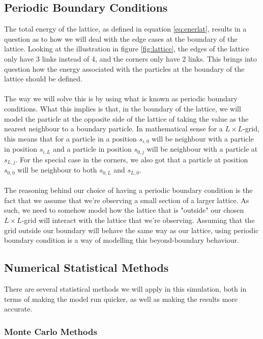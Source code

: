 \documentclass[reprint,english,notitlepage]{revtex4-1}  %
\begin{document}
\subsection{Periodic Boundary Conditions}

The total energy of the lattice, as defined in equation \ref{eq:enerlat}, results in a question as to how we will deal with the edge cases at the boundary of the lattice. Looking at the illustration in figure \ref{fig:lattice}, the edges of the lattice only have 3 links instead of 4, and the corners only have 2 links. This brings into question how the energy associated with the particles at the boundary of the lattice should be defined.
\\
\\
The way we will solve this is by using what is known as periodic boundary conditions. What this implies is that, in the boundary of the lattice, we will model the particle at the opposite side of the lattice of taking the value as the nearest neighbour to a boundary particle. In mathematical sense for a $L\times L$-grid, this means that for a particle in a position $s_{i,0}$ will be neighbour with a particle in position $s_{i,L}$ and a particle in position $s_{0,j}$ will be neighbour with a particle at $s_{L,j}$. For the special case in the corners, we also got that a particle at position $s_{0,0}$ will be neighbour to both $s_{0,L}$ and $s_{L,0}$. 
\\
\\
The reasoning behind our choice of having a periodic boundary condition is the fact that we assume that we're observing a small section of a larger lattice. As such, we need to somehow model how the lattice that is "outside" our chosen $L\times L$-grid will interact with the lattice that we're observing. Assuming that the grid outside our boundary will behave the same way as our lattice, using periodic boundary condition is a way of modelling this beyond-boundary behaviour.

\subsection{Numerical Statistical Methods}

There are several statistical methods we will apply in this simulation, both in terms of making the model run quicker, as well as making the results more accurate. 

\subsubsection{Monte Carlo Methods}\label{sec:MonCarMet}
\end{document}

